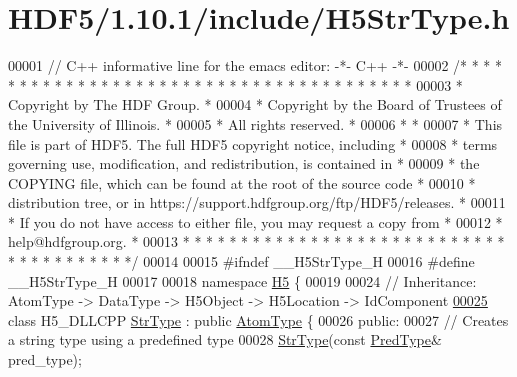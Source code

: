 \hypertarget{_h_d_f5_21_810_81_2include_2_h5_str_type_8h_source}{}\section{H\+D\+F5/1.10.1/include/\+H5\+Str\+Type.h}
\label{_h_d_f5_21_810_81_2include_2_h5_str_type_8h_source}

\begin{DoxyCode}
00001 \textcolor{comment}{// C++ informative line for the emacs editor: -*- C++ -*-}
00002 \textcolor{comment}{/* * * * * * * * * * * * * * * * * * * * * * * * * * * * * * * * * * * * * * *}
00003 \textcolor{comment}{ * Copyright by The HDF Group.                                               *}
00004 \textcolor{comment}{ * Copyright by the Board of Trustees of the University of Illinois.         *}
00005 \textcolor{comment}{ * All rights reserved.                                                      *}
00006 \textcolor{comment}{ *                                                                           *}
00007 \textcolor{comment}{ * This file is part of HDF5.  The full HDF5 copyright notice, including     *}
00008 \textcolor{comment}{ * terms governing use, modification, and redistribution, is contained in    *}
00009 \textcolor{comment}{ * the COPYING file, which can be found at the root of the source code       *}
00010 \textcolor{comment}{ * distribution tree, or in https://support.hdfgroup.org/ftp/HDF5/releases.  *}
00011 \textcolor{comment}{ * If you do not have access to either file, you may request a copy from     *}
00012 \textcolor{comment}{ * help@hdfgroup.org.                                                        *}
00013 \textcolor{comment}{ * * * * * * * * * * * * * * * * * * * * * * * * * * * * * * * * * * * * * * */}
00014 
00015 \textcolor{preprocessor}{#ifndef \_\_H5StrType\_H}
00016 \textcolor{preprocessor}{#define \_\_H5StrType\_H}
00017 
00018 \textcolor{keyword}{namespace }\hyperlink{namespace_h5}{H5} \{
00019 
00024 \textcolor{comment}{//  Inheritance: AtomType -> DataType -> H5Object -> H5Location -> IdComponent}
\hyperlink{class_h5_1_1_str_type}{00025} \textcolor{keyword}{class }H5\_DLLCPP \hyperlink{class_h5_1_1_str_type}{StrType} : \textcolor{keyword}{public} \hyperlink{class_h5_1_1_atom_type}{AtomType} \{
00026    \textcolor{keyword}{public}:
00027         \textcolor{comment}{// Creates a string type using a predefined type}
00028         \hyperlink{class_h5_1_1_str_type}{StrType}(\textcolor{keyword}{const} \hyperlink{class_h5_1_1_pred_type}{PredType}& pred\_type);

\end{DoxyCode}
